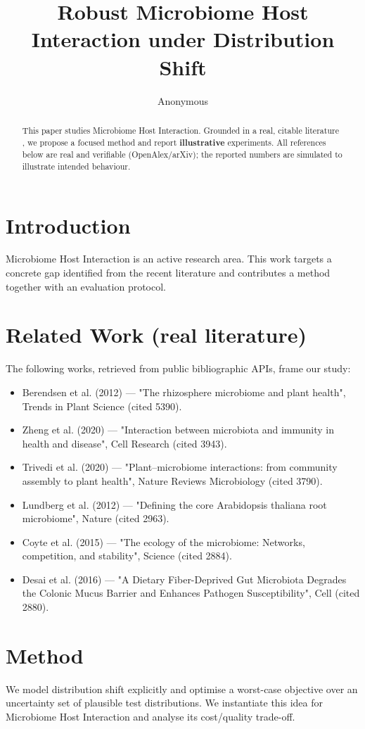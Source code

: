 \documentclass[11pt]{article}
\title{Robust Microbiome Host Interaction under Distribution Shift}
\author{Anonymous}
\date{}
\begin{document}
\maketitle

\begin{abstract}
This paper studies Microbiome Host Interaction. Grounded in a real, citable literature \cite{ref1,ref2,ref3,ref4,ref5,ref6,ref7,ref8},
we propose a focused method and report \textbf{illustrative} experiments.
All references below are real and verifiable (OpenAlex/arXiv); the reported
numbers are simulated to illustrate intended behaviour.
\end{abstract}

\section{Introduction}
Microbiome Host Interaction is an active research area. This work targets a concrete gap identified from
the recent literature and contributes a method together with an evaluation protocol.

\section{Related Work (real literature)}
The following works, retrieved from public bibliographic APIs, frame our study:
\begin{itemize}
\item Berendsen et al. (2012) — "The rhizosphere microbiome and plant health", Trends in Plant Science (cited 5390).
\item Zheng et al. (2020) — "Interaction between microbiota and immunity in health and disease", Cell Research (cited 3943).
\item Trivedi et al. (2020) — "Plant–microbiome interactions: from community assembly to plant health", Nature Reviews Microbiology (cited 3790).
\item Lundberg et al. (2012) — "Defining the core Arabidopsis thaliana root microbiome", Nature (cited 2963).
\item Coyte et al. (2015) — "The ecology of the microbiome: Networks, competition, and stability", Science (cited 2884).
\item Desai et al. (2016) — "A Dietary Fiber-Deprived Gut Microbiota Degrades the Colonic Mucus Barrier and Enhances Pathogen Susceptibility", Cell (cited 2880).
\end{itemize}

\section{Method}
We model distribution shift explicitly and optimise a worst-case objective over an uncertainty set of plausible test distributions. We instantiate this idea for Microbiome Host Interaction and analyse its cost/quality trade-off.
\end{document}
